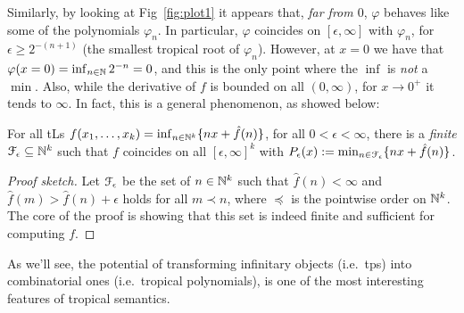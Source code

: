 Similarly, by looking at Fig~\ref{fig:plot1} it appears that, \emph{far from $0$}, $\varphi$ behaves like some of the polynomials $\varphi_{n}$.
In particular, %
$\varphi$ coincides on $[\epsilon,\infty]$ with $\varphi_{n}$,
for $\epsilon \geq 2^{-(n+1)}$ (the smallest tropical root of $\varphi_{n}$).
However, at
%
 $x=0$ we have that $\varphi(x=0)=\inf_{n\in\mathbb{N}} 2^{-n}=0$, and this is the only point where the $\inf$ is \emph{not} a $\min$.
Also, while the derivative of $f$ is bounded on all $(0,\infty)$, for $x\to 0^+$ it tends to $\infty$.
In fact, this is a general phenomenon, as showed below:
% 

\begin{theorem}\label{theorem:fepsilon}
For all tLs $f(x_{1},\dots, x_{k})=\inf_{n\in \mathbb N^{k}}\{n x+\hat{f}(n)\}$, for all $0<\epsilon<\infty$, there is a \emph{finite} $\mathcal{F}_\epsilon \subseteq \mathbb{N}^k$ such that 
% 
$f$ coincides on all $[\epsilon,\infty]^k$ with $P_\epsilon( x):=\min_{n\in \mathcal{F}_\epsilon}\{n x+\hat{f}(n)\}$.
\end{theorem}
\begin{proof}[Proof sketch]
Let $\mathcal{F}_\epsilon$ be the set of $n\in\mathbb{N}^{k}$ such that 
$\widehat f(n)<\infty$ and $\widehat f(m)> \widehat f(n)+\epsilon$ holds for all $m\prec n$, where $\preceq$ is the pointwise order on $\mathbb{N}^k$.
The core of the proof is showing that this set is indeed finite and sufficient for computing $f$.
\end{proof}

As we'll see, the potential of transforming infinitary objects (i.e.~tps) into combinatorial ones (i.e.~tropical polynomials), is one of the most interesting features of tropical semantics. 

%

